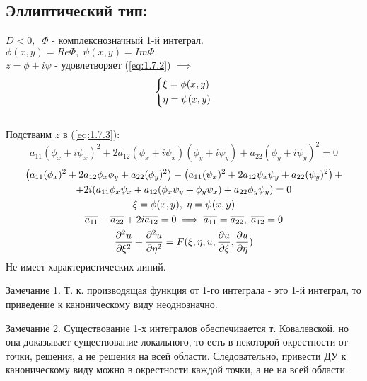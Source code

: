\documentclass[../main.tex]{subfiles}
\begin{document}
\subsection*{Эллиптический тип:}
$D<0, \;\; \Phi$ - комплекснозначный 1-й интеграл. \\
$\phi(x,y) = Re\Phi, \; \psi(x,y) = Im\Phi$\\
$z = \phi + i\psi$ - удовлетворяет (\ref{eq:1.7.2}) $\implies$\\
$$\begin{dcases} \xi = \phi(x,y) \\ \eta = \psi(x,y) \end{dcases}$$\\
Подстваим $z$ в (\ref*{eq:1.7.3}):
\begin{equation}
	a_{11}(\phi_x+i\psi_x)^2 + 2a_{12}(\phi_x + i\psi_x)(\phi_y + i\psi_y) + a_{22}(\phi_y + i\psi_y)^2 = 0
\end{equation}
\begin{gather*}
\left(a_{11}(\phi_x)^2 + 2a_{12}\phi_x\phi_y + a_{22}(\phi_y)^2 \right) - \left(a_{11}(\psi_x)^2 + 2a_{12}\psi_x\psi_y + a_{22}(\psi_y)^2\right)+\\
 + 2i(a_{11}\phi_x\psi_x + a_{12}(\phi_x\psi_y + \phi_y\psi_x)+a_{22}\phi_y\psi_y)=0 \\
\xi = \phi(x,y),\; \eta = \psi(x,y)\\
\overline{a_{11}} - \overline{a{_{22}}} + 2i\overline{a_{12}} = 0 \implies
\overline{a_{11}}=\overline{a_{22}}, \; \overline{a_{12}}=0 \\
\frac{\partial^2u}{\partial{\xi^2}} + \frac{\partial^2u}{\partial{\eta^2}} = F(\xi, \eta, u, \frac{\partial u}{\partial \xi}, \frac{\partial u}{\partial \eta})\\
\end{gather*}
Не имеет характеристических линий.
\par Замечание 1. Т. к. производящая функция от 1-го интеграла - это 1-й интеграл, то приведение к каноническому виду неоднозначно.
\par Замечание 2. Существование 1-х интегралов обеспечивается т. Ковалевской, но она доказывает существование локального, то есть в некоторой окрестности от точки, решения, а не решения на всей области. Следовательно, привести ДУ к каноническому виду можно в окрестности каждой точки, а не на всей области.
\end{document}
